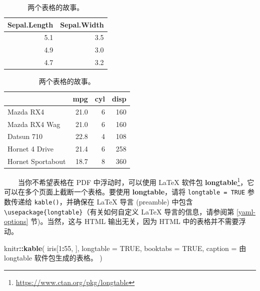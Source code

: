 \documentclass[
  12pt,
]{krantz}
\newenvironment{Shaded}{\begin{snugshade}}{\end{snugshade}}
\newcommand{\AttributeTok}[1]{\textcolor[rgb]{0.13,0.29,0.53}{#1}}
\newcommand{\ConstantTok}[1]{\textcolor[rgb]{0.56,0.35,0.01}{#1}}
\newcommand{\DecValTok}[1]{\textcolor[rgb]{0.00,0.00,0.81}{#1}}
\newcommand{\FunctionTok}[1]{\textcolor[rgb]{0.13,0.29,0.53}{\textbf{#1}}}
\newcommand{\NormalTok}[1]{#1}
\newcommand{\SpecialCharTok}[1]{\textcolor[rgb]{0.81,0.36,0.00}{\textbf{#1}}}
\newcommand{\StringTok}[1]{\textcolor[rgb]{0.31,0.60,0.02}{#1}}
\renewcommand{\href}[2]{#2\footnote{\url{#1}}}
\theoremstyle{definition}
\theoremstyle{definition}
\theoremstyle{definition}
\theoremstyle{definition}
\theoremstyle{remark}
\begin{document}
\begin{table}
\caption{\label{tab:table-multi}两个表格的故事。}

\centering
\begin{tabular}[t]{rr}
\toprule
Sepal.Length & Sepal.Width\\
\midrule
5.1 & 3.5\\
4.9 & 3.0\\
4.7 & 3.2\\
\bottomrule
\end{tabular}
\centering
\begin{tabular}[t]{lrrr}
\toprule
  & mpg & cyl & disp\\
\midrule
Mazda RX4 & 21.0 & 6 & 160\\
Mazda RX4 Wag & 21.0 & 6 & 160\\
Datsun 710 & 22.8 & 4 & 108\\
Hornet 4 Drive & 21.4 & 6 & 258\\
Hornet Sportabout & 18.7 & 8 & 360\\
\bottomrule
\end{tabular}
\end{table}

  当你不希望表格在 PDF 中浮动时，可以使用 LaTeX 软件包 \href{https://www.ctan.org/pkg/longtable}{\textbf{longtable}}，它可以在多个页面上截断一个表格。要使用 \textbf{longtable}，请将 \texttt{longtable\ =\ TRUE} 参数传递给 \texttt{kable()}，并确保在 LaTeX 导言 (preamble) 中包含 \texttt{\textbackslash{}usepackage\{longtable\}}（有关如何自定义 LaTeX 导言的信息，请参阅第 \ref{yaml-options} 节)。当然，这与 HTML 输出无关，因为 HTML 中的表格并不需要浮动。

\begin{Shaded}
\begin{Highlighting}[]
\NormalTok{knitr}\SpecialCharTok{::}\FunctionTok{kable}\NormalTok{(}
\NormalTok{  iris[}\DecValTok{1}\SpecialCharTok{:}\DecValTok{55}\NormalTok{, ], }\AttributeTok{longtable =} \ConstantTok{TRUE}\NormalTok{, }\AttributeTok{booktabs =} \ConstantTok{TRUE}\NormalTok{,}
  \AttributeTok{caption =} \StringTok{\textquotesingle{}由 longtable 软件包生成的表格。\textquotesingle{}}
\NormalTok{)}
\end{Highlighting}
\end{Shaded}
\end{document}
